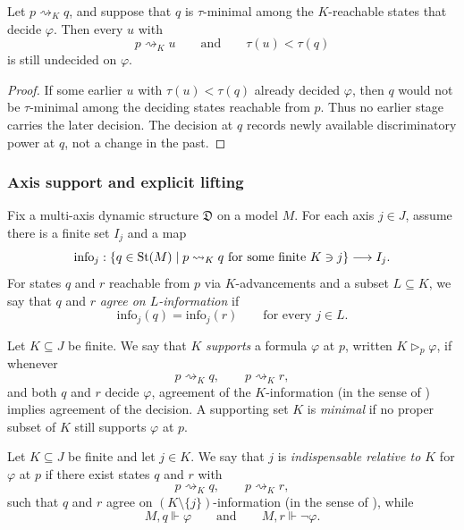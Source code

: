 \begin{proposition}\label{prop:nonretrocausal-delayed-classification}
Let $p\rightsquigarrow_K q$, and suppose that $q$ is $\tau$-minimal among the $K$-reachable states that decide $\varphi$. Then every $u$ with
\[
p\rightsquigarrow_K u
\qquad\text{and}\qquad
\tau(u)<\tau(q)
\]
is still undecided on $\varphi$.
\end{proposition}

\begin{proof}
If some earlier $u$ with $\tau(u)<\tau(q)$ already decided $\varphi$, then $q$ would not be $\tau$-minimal among the deciding states reachable from $p$. Thus no earlier stage carries the later decision. The decision at $q$ records newly available discriminatory power at $q$, not a change in the past.
\end{proof}

\subsubsection{Axis support and explicit lifting}

\begin{definition}\label{def:axis-information-maps}
Fix a multi-axis dynamic structure $\mathfrak{D}$ on a model $M$. For each axis $j\in J$, assume there is a finite set $I_j$ and a map
\[
\mathrm{info}_j:\{q\in\mathrm{St}(M)\mid p\rightsquigarrow_K q\text{ for some finite }K\ni j\}\longrightarrow I_j.
\]
For states $q$ and $r$ reachable from $p$ via $K$-advancements and a subset $L\subseteq K$, we say that $q$ and $r$ \emph{agree on $L$-information} if
\[
\mathrm{info}_j(q)=\mathrm{info}_j(r)
\qquad
\text{for every }j\in L.
\]
\end{definition}

\begin{definition}\label{def:axis-support}
Let $K\subseteq J$ be finite. We say that $K$ \emph{supports} a formula $\varphi$ at $p$, written $K\triangleright_p\varphi$, if whenever
\[
p\rightsquigarrow_K q,\qquad
p\rightsquigarrow_K r,
\]
and both $q$ and $r$ decide $\varphi$, agreement of the $K$-information (in the sense of ) implies agreement of the decision. A supporting set $K$ is \emph{minimal} if no proper subset of $K$ still supports $\varphi$ at $p$.
\end{definition}

\begin{definition}[Indispensability]\label{def:axis-indispensability}
Let $K\subseteq J$ be finite and let $j\in K$. We say that $j$ is \emph{indispensable relative to $K$} for $\varphi$ at $p$ if there exist states $q$ and $r$ with
\[
p\rightsquigarrow_K q,\qquad
p\rightsquigarrow_K r,
\]
such that $q$ and $r$ agree on $(K\setminus\{j\})$-information (in the sense of ), while
\[
M,q\Vdash\varphi
\qquad\text{and}\qquad
M,r\Vdash\neg\varphi.
\]
\end{definition}

